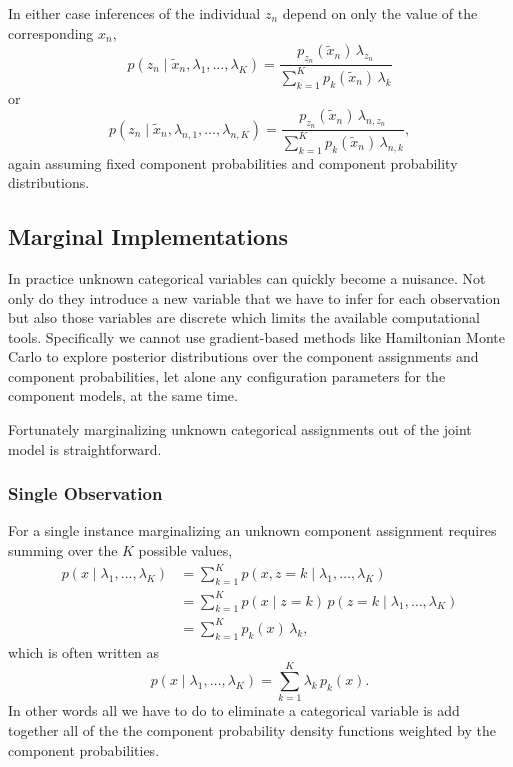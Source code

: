 \documentclass[
  letterpaper,
  DIV=11,
  numbers=noendperiod]{scrartcl}
\begin{document}
In either case inferences of the individual \(z_{n}\) depend on only the
value of the corresponding \(x_{n}\), \[
p(z_{n} \mid \tilde{x}_{n}, \lambda_{1}, \ldots, \lambda_{K})
=
\frac{ p_{z_{n}}(\tilde{x}_{n}) \, \lambda_{z_{n}}}
{ \sum_{k = 1}^{K} p_{k}(\tilde{x}_{n}) \, \lambda_{k} }
\] or \[
p(z_{n} \mid \tilde{x}_{n}, \lambda_{n, 1}, \ldots, \lambda_{n, K})
=
\frac{ p_{z_{n}}(\tilde{x}_{n}) \, \lambda_{n, z_{n}}}
{ \sum_{k = 1}^{K} p_{k}(\tilde{x}_{n}) \, \lambda_{n, k} },
\] again assuming fixed component probabilities and component
probability distributions.

\subsection{Marginal Implementations}\label{marginal-implementations}

In practice unknown categorical variables can quickly become a nuisance.
Not only do they introduce a new variable that we have to infer for each
observation but also those variables are discrete which limits the
available computational tools. Specifically we cannot use gradient-based
methods like Hamiltonian Monte Carlo to explore posterior distributions
over the component assignments and component probabilities, let alone
any configuration parameters for the component models, at the same time.

Fortunately marginalizing unknown categorical assignments out of the
joint model is straightforward.

\subsubsection{Single Observation}\label{single-observation}

For a single instance marginalizing an unknown component assignment
requires summing over the \(K\) possible values, \begin{align*}
p(x \mid \lambda_{1}, \ldots, \lambda_{K})
&=
\sum_{k = 1}^{K}
p(x, z = k \mid \lambda_{1}, \ldots, \lambda_{K})
\\
&=
\sum_{k = 1}^{K}
p(x \mid z = k) \, p(z = k \mid \lambda_{1}, \ldots, \lambda_{K})
\\
&=
\sum_{k = 1}^{K}
p_{k}(x) \, \lambda_{k},
\end{align*} which is often written as \begin{equation*}
p(x \mid \lambda_{1}, \ldots, \lambda_{K})
=
\sum_{k = 1}^{K}
\lambda_{k} \, p_{k}(x).
\end{equation*} In other words all we have to do to eliminate a
categorical variable is add together all of the the component
probability density functions weighted by the component probabilities.
\end{document}
